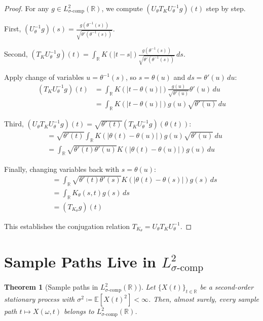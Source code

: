 \documentclass{article}
\newtheorem{theorem}{Theorem}[section]
\begin{document}
\begin{proof}
For any $g\in L^2_{\sigma\text{-comp}}(\mathbb{R})$, we compute $(U_\theta T_K U_\theta^{-1}g)(t)$ step by step.

First, $(U_\theta^{-1}g)(s) = \frac{g(\theta^{-1}(s))}{\sqrt{\theta'(\theta^{-1}(s))}}$.

Second, $(T_K U_\theta^{-1}g)(t) = \int_{\mathbb{R}} K(|t-s|)\frac{g(\theta^{-1}(s))}{\sqrt{\theta'(\theta^{-1}(s))}}\,ds$.

Apply change of variables $u=\theta^{-1}(s)$, so $s=\theta(u)$ and $ds=\theta'(u)\,du$:
\begin{align}
(T_K U_\theta^{-1}g)(t) &= \int_{\mathbb{R}} K(|t-\theta(u)|)\frac{g(u)}{\sqrt{\theta'(u)}}\theta'(u)\,du\\
&= \int_{\mathbb{R}} K(|t-\theta(u)|)g(u)\sqrt{\theta'(u)}\,du
\end{align}

Third, $(U_\theta T_K U_\theta^{-1}g)(t) = \sqrt{\theta'(t)}(T_K U_\theta^{-1}g)(\theta(t))$:
\begin{align}
&= \sqrt{\theta'(t)}\int_{\mathbb{R}} K(|\theta(t)-\theta(u)|)g(u)\sqrt{\theta'(u)}\,du\\
&= \int_{\mathbb{R}} \sqrt{\theta'(t)\theta'(u)}K(|\theta(t)-\theta(u)|)g(u)\,du
\end{align}

Finally, changing variables back with $s=\theta(u)$:
\begin{align}
&= \int_{\mathbb{R}} \sqrt{\theta'(t)\theta'(s)}K(|\theta(t)-\theta(s)|)g(s)\,ds\\
&= \int_{\mathbb{R}} K_\theta(s,t)g(s)\,ds\\
&= (T_{K_\theta}g)(t)
\end{align}

This establishes the conjugation relation $T_{K_\theta}=U_\theta T_K U_\theta^{-1}$.
\end{proof}

\section{Sample Paths Live in $L^2_{\sigma\text{-comp}}$}\label{sec:samplepaths}

\begin{theorem}[Sample paths in $L^2_{\sigma\text{-comp}}(\mathbb{R})$]\label{thm:paths_sigma_comp}
Let $\{X(t)\}_{t\in\mathbb{R}}$ be a second-order stationary process with $\sigma^2\coloneqq \mathbb{E}[X(t)^2]<\infty$. Then, almost surely, every sample path $t\mapsto X(\omega,t)$ belongs to $L^2_{\sigma\text{-comp}}(\mathbb{R})$.
\end{theorem}
\end{document}
